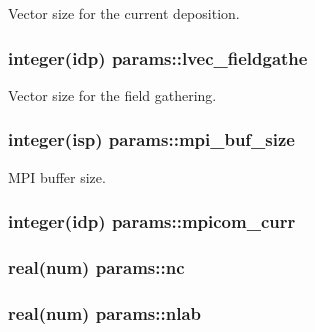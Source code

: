 Vector size for the current deposition. 

\subsubsection[{\texorpdfstring{lvec\+\_\+fieldgathe}{lvec_fieldgathe}}]{\setlength{\rightskip}{0pt plus 5cm}integer(idp) params\+::lvec\+\_\+fieldgathe}\hypertarget{namespaceparams_acb2db26088c715aabd2ca6722e0bcdc6}{}\label{namespaceparams_acb2db26088c715aabd2ca6722e0bcdc6}


Vector size for the field gathering. 

\subsubsection[{\texorpdfstring{mpi\+\_\+buf\+\_\+size}{mpi_buf_size}}]{\setlength{\rightskip}{0pt plus 5cm}integer(isp) params\+::mpi\+\_\+buf\+\_\+size}\hypertarget{namespaceparams_aa785f776093a166811d21fa25c320b75}{}\label{namespaceparams_aa785f776093a166811d21fa25c320b75}


M\+PI buffer size. 

\subsubsection[{\texorpdfstring{mpicom\+\_\+curr}{mpicom_curr}}]{\setlength{\rightskip}{0pt plus 5cm}integer(idp) params\+::mpicom\+\_\+curr}\hypertarget{namespaceparams_a5e7c931ca55f3ac5e5171dc97c3269b1}{}\label{namespaceparams_a5e7c931ca55f3ac5e5171dc97c3269b1}
\subsubsection[{\texorpdfstring{nc}{nc}}]{\setlength{\rightskip}{0pt plus 5cm}real(num) params\+::nc}\hypertarget{namespaceparams_adb7d5f7cb5d7431bdf0e5a8ea5b1ad56}{}\label{namespaceparams_adb7d5f7cb5d7431bdf0e5a8ea5b1ad56}
\subsubsection[{\texorpdfstring{nlab}{nlab}}]{\setlength{\rightskip}{0pt plus 5cm}real(num) params\+::nlab}\hypertarget{namespaceparams_a977c294dda0d117791fd0e6f7c9bdad5}{}\label{namespaceparams_a977c294dda0d117791fd0e6f7c9bdad5}
